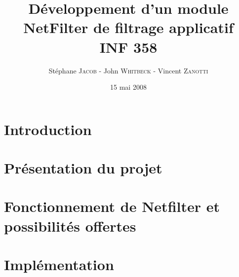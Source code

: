 \documentclass[a4paper,12pt]{article}
\title{Développement d'un module NetFilter de filtrage applicatif\\INF 358}
\author{Stéphane \textsc{Jacob} - John \textsc{Whitbeck} - Vincent \textsc{Zanotti}}
\date{15 mai 2008}
\begin{document}
\maketitle

\section*{Introduction}

\newpage

\section{Présentation du projet}

\newpage

\section{Fonctionnement de Netfilter et possibilités offertes}

\newpage

\section{Implémentation}


%

\nocite{C}
\nocite{S}

\newpage
{}

\end{document}
